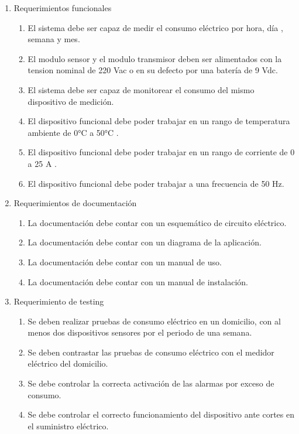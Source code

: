 \documentclass[
11pt, %
]{charter}
\begin{document}
\begin{enumerate}
	\item Requerimientos funcionales
		\begin{enumerate}
			\item El sistema debe ser capaz de medir el consumo eléctrico por hora, día , semana y mes.
			\item El modulo sensor y el modulo transmisor deben ser alimentados con la tension nominal de 220 Vac o en su defecto por una batería de 9 Vdc.
			\item El sistema debe ser capaz de monitorear el consumo del mismo dispositivo de medición.
			\item El dispositivo funcional debe poder trabajar en un rango de temperatura ambiente de 0°C a 50°C .
			\item El dispositivo funcional debe poder trabajar en un rango de corriente de 0 a 25 A .
			\item El dispositivo funcional debe poder trabajar a una frecuencia de 50 Hz.
			
		\end{enumerate}
		
	\item Requerimientos de documentación
		\begin{enumerate}
			\item La documentación debe contar con un esquemático de circuito eléctrico.
			\item La documentación debe contar con  un diagrama de la aplicación.
			\item La documentación debe contar con un manual de uso.
			\item La documentación debe contar con un manual de instalación.
		\end{enumerate}
		
	\item Requerimiento de testing
		\begin{enumerate}
			\item Se deben realizar pruebas de consumo eléctrico en un domicilio, con al menos dos dispositivos sensores por el periodo de una semana.
			\item Se deben contrastar las pruebas de consumo eléctrico con el medidor eléctrico del domicilio.
			\item Se debe controlar la correcta activación de las alarmas por exceso de consumo.
			\item Se debe controlar el correcto funcionamiento del dispositivo ante cortes en el suministro eléctrico.
								

\end{enumerate}
\end{enumerate}
\end{document}
